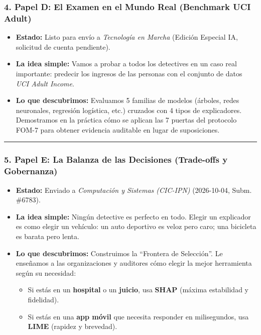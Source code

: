 \documentclass[
]{article}
\providecommand{\tightlist}{%
  \setlength{\itemsep}{0pt}\setlength{\parskip}{0pt}}
\begin{document}
\subsubsection{4. Papel D: El Examen en el Mundo Real (Benchmark UCI
Adult)}\label{papel-d-el-examen-en-el-mundo-real-benchmark-uci-adult}

\begin{itemize}
\tightlist
\item
  \textbf{Estado:} Listo para envío a \emph{Tecnología en Marcha}
  (Edición Especial IA, solicitud de cuenta pendiente).
\item
  \textbf{La idea simple:} Vamos a probar a todos los detectives en un
  caso real importante: predecir los ingresos de las personas con el
  conjunto de datos \emph{UCI Adult Income}.
\item
  \textbf{Lo que descubrimos:} Evaluamos 5 familias de modelos (árboles,
  redes neuronales, regresión logística, etc.) cruzados con 4 tipos de
  explicadores. Demostramos en la práctica cómo se aplican las 7 puertas
  del protocolo FOM-7 para obtener evidencia auditable en lugar de
  suposiciones.
\end{itemize}

\begin{center}\rule{0.5\linewidth}{0.5pt}\end{center}

\subsubsection{5. Papel E: La Balanza de las Decisiones (Trade-offs y
Gobernanza)}\label{papel-e-la-balanza-de-las-decisiones-trade-offs-y-gobernanza}

\begin{itemize}
\tightlist
\item
  \textbf{Estado:} Enviado a \emph{Computación y Sistemas (CIC-IPN)}
  (2026-10-04, Subm. \#6783).
\item
  \textbf{La idea simple:} Ningún detective es perfecto en todo. Elegir
  un explicador es como elegir un vehículo: un auto deportivo es veloz
  pero caro; una bicicleta es barata pero lenta.
\item
  \textbf{Lo que descubrimos:} Construimos la ``Frontera de Selección''.
  Le enseñamos a las organizaciones y auditores cómo elegir la mejor
  herramienta según su necesidad:

  \begin{itemize}
  \tightlist
  \item
    Si estás en un \textbf{hospital} o un \textbf{juicio}, usa
    \textbf{SHAP} (máxima estabilidad y fidelidad).
  \item
    Si estás en una \textbf{app móvil} que necesita responder en
    milisegundos, usa \textbf{LIME} (rapidez y brevedad).
  \end{itemize}
\end{itemize}
\end{document}
